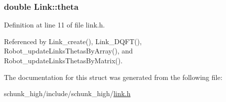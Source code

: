 \hypertarget{structLink_a88e705bc7fb6c7c8c7fa6987b52667d6}{
\subsubsection[{theta}]{\setlength{\rightskip}{0pt plus 5cm}double Link\-::theta}}\label{structLink_a88e705bc7fb6c7c8c7fa6987b52667d6}


Definition at line 11 of file link.\-h.



Referenced by Link\-\_\-create(), Link\-\_\-\-D\-Q\-F\-T(), Robot\-\_\-update\-Links\-Thetas\-By\-Array(), and Robot\-\_\-update\-Links\-Thetas\-By\-Matrix().



The documentation for this struct was generated from the following file\-:\begin{DoxyCompactItemize}
\item 
schunk\-\_\-high/include/schunk\-\_\-high/\hyperlink{link_8h}{link.\-h}\end{DoxyCompactItemize}
